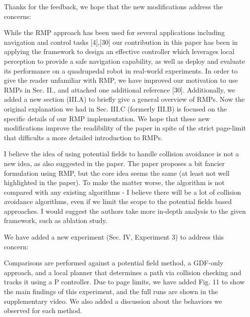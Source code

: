\documentclass[a4paper,11pt]{article}
\begin{document}
Thanks for the feedback, we hope that the new modifications address the 
concerns:
\begin{outline}[enumerate]
  \1 While the RMP approach has been used for several applications including 
  	 navigation and control tasks [4],[30]
	 our contribution in this paper has been in applying the framework to design an effective controller which leverages local
	 perception to provide a safe navigation capability, as well as deploy and  
	 evaluate its performance on a quadrupedal robot in real-world experiments. 
  \1 In order to give the reader unfamiliar with RMP, we have improved our 
  	 motivation to use RMPs in Sec. II., and attached one additional reference 
  	 [30].
  \1 Additionally, we added a new section (III.A) to briefly give a general 
  	 overview of RMPs.
  \1 Now the original explanation we had in Sec. III.C (formerly III.B) is 
  	 focused on the specific details of our RMP implementation. 
  \1 We hope that these new modifications improve the readibility of the paper 
 	 in spite of the strict page-limit that difficults a more detailed 
 	 introduction to RMPs.  
\end{outline}


\begin{displayquote}
	I believe the idea of using potential fields to handle collision
	avoidance is not a new idea, as also suggested in the paper. The paper
	proposes a bit fancier formulation using RMP, but the core idea seems
	the same (at least not well highlighted in the paper). To make the
	matter worse, the algorithm is not compared with any existing
	algorithms - I believe there will be a lot of collision avoidance
	algorithms, even if we limit the scope to the potential fields based
	approaches. I would suggest the authors take more in-depth analysis to
	the given framework, such as ablation study.
\end{displayquote}

We have added a new experiment (Sec. IV, Experiment 3) to address this concern:

\begin{outline}[enumerate]
	\1 Comparisons are performed against a potential field method, a GDF-only 
	approach, and a local planner that determines a path via collision checking 
	and tracks it using a P controller.
	\1 Due to page limits, we have added Fig. 11 to show the main findings of 
	this experiment, and the full runs are shown in the supplementary video.
	\1 We also added a discussion about the behaviors we observed for each 
	method.
\end{outline}
\end{document}
